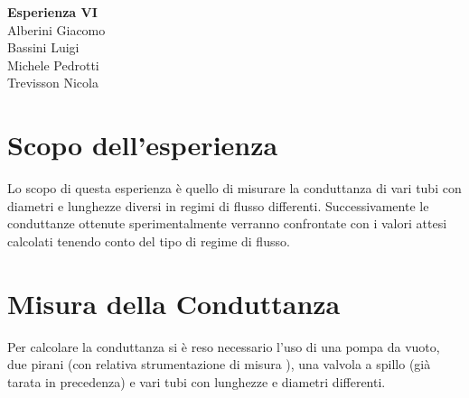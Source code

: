 \documentclass[a4paper,11pt]{article}
\begin{document}
\begin{center}
\textbf{\huge Esperienza VI} \\ \vspace{10pt}
\large Alberini Giacomo \\ Bassini Luigi \\ Michele Pedrotti\\ Trevisson Nicola 
\end{center}
\section{Scopo dell'esperienza}
Lo scopo di questa esperienza è quello di misurare la conduttanza di vari tubi con diametri e lunghezze diversi in regimi di flusso differenti. Successivamente le conduttanze ottenute sperimentalmente verranno confrontate con i valori attesi calcolati tenendo conto del tipo di regime di flusso. 
\section{Misura della Conduttanza}

Per calcolare la conduttanza si è reso necessario l'uso di una pompa da vuoto, due pirani (con relativa strumentazione di misura ), una valvola a spillo (già tarata in precedenza) e vari tubi con lunghezze e diametri differenti.
\end{document}
